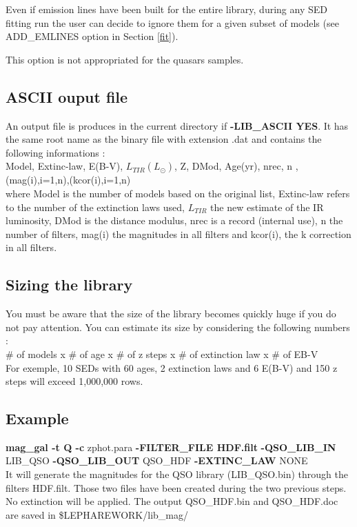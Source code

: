 \documentclass[12pt]{article}
\begin{document}
Even if emission lines have been built for the entire library, during any SED fitting run the user can decide to ignore them for a given subset of models (see ADD\_EMLINES option in Section \ref{fit}).  

This option is not appropriated for the quasars samples.

\subsection{ASCII ouput file}

 An output file is produces in the current directory if {\bf -LIB\_ASCII YES}.
 It has the same root name as the binary file with extension .dat and  contains the following informations :  \\
%  
  Model, Extinc-law, E(B-V), $L_{TIR}(L_{\odot})$, Z, DMod, Age(yr), nrec, n , (mag(i),i=1,n),(kcor(i),i=1,n) \\ 
  where Model is the number of models based on the original list, Extinc-law refers to the number of the 
  extinction laws used, $L_{TIR}$ the new estimate of the IR luminosity, DMod is the distance modulus, nrec is a record (internal use), n the number of filters, mag(i) the magnitudes in all filters and kcor(i), the k correction in all filters. 


\subsection{Sizing the library}

 You must be aware that the size of the library becomes quickly huge if you do not pay attention. You can estimate its size by considering the following numbers : \\
   \# of models x \# of age x \# of z steps x \# of extinction law x \# of EB-V \\
For exemple, 10 SEDs with 60 ages, 2 extinction laws and 6 E(B-V) and 150 z steps will exceed 1,000,000 rows. \\
  

\subsection{ Example}

{\bf mag\_gal -t Q -c} zphot.para {\bf -FILTER\_FILE HDF.filt}  {\bf -QSO\_LIB\_IN}  LIB\_QSO  {\bf -QSO\_LIB\_OUT}  QSO\_HDF {\bf -EXTINC\_LAW}  NONE\\
%
It will generate the magnitudes for the QSO library (LIB\_QSO.bin)  through the filters HDF.filt. 
 Those two files have been created during the two previous steps. 
 No extinction will be applied. The output QSO\_HDF.bin and QSO\_HDF.doc are 
 saved in  \$LEPHAREWORK/lib\_mag/   \\
\end{document}
